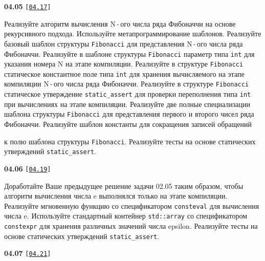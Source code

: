 \documentclass[a4paper,12pt]{article}
\begin{document}
\bigskip

{\large \textbf{04.05} \texttt{[\href{https://github.com/i-s-m-mipt/Education/blob/master/projects/examples/source/04.17.cpp}{\texttt{04.17}}]}}

\bigskip

Реализуйте алгоритм вычисления N\,-\,ого числа ряда Фибоначчи на основе рекурсивного подхода. Используйте метапрограммирование шаблонов. Реализуйте базовый шаблон структуры \lstinline{Fibonacci} для представления N\,-\,ого числа ряда Фибоначчи. Реализуйте в шаблоне структуры \lstinline{Fibonacci} параметр типа \lstinline{int} для указания номера N на этапе компиляции. Реализуйте в структуре \lstinline{Fibonacci} статическое константное поле типа \lstinline{int} для хранения вычисляемого на этапе компиляции N\,-\,ого числа ряда Фибоначчи. Реализуйте в структуре \lstinline{Fibonacci} статическое утверждение \lstinline{static_assert} для проверки переполнения типа \lstinline{int} при вычислениях на этапе компиляции. Реализуйте две полные специализации шаблона структуры \lstinline{Fibonacci} для представления первого и второго чисел ряда Фибоначчи. Реализуйте шаблон константы для сокращения записей обращений 

к полю шаблона структуры \lstinline{Fibonacci}. Реализуйте тесты на основе статических утверждений \lstinline{static_assert}.

\bigskip

{\large \textbf{04.06} \texttt{[\href{https://github.com/i-s-m-mipt/Education/blob/master/projects/examples/source/04.19.cpp}{\texttt{04.19}}]}}

\bigskip

Доработайте Ваше предыдущее решение задачи 02.05 таким образом, чтобы алгоритм вычисления числа e выполнялся только на этапе компиляции. Реализуйте мгновенную функцию со спецификатором \lstinline{consteval} для вычисления числа e. Используйте стандартный контейнер \lstinline{std::array} со спецификатором \lstinline{constexpr} для хранения различных значений числа epsilon. Реализуйте тесты на основе статических утверждений \lstinline{static_assert}.

\bigskip

{\large \textbf{04.07} \texttt{[\href{https://github.com/i-s-m-mipt/Education/blob/master/projects/examples/source/04.21.cpp}{\texttt{04.21}}]}}

\bigskip
\end{document}
